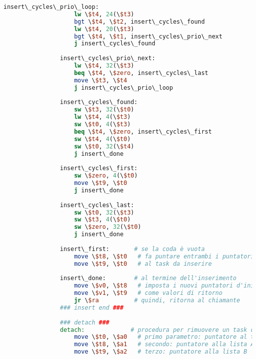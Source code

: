 \begin{center}
\begin{lstlisting}[language=mips, gobble=14, stepnumber=1]
                insert\_cycles\_prio\_loop:
                    lw \$t4, 24(\$t3)
                    bgt \$t4, \$t2, insert\_cycles\_found
                    lw \$t4, 20(\$t3)
                    bgt \$t4, \$t1, insert\_cycles\_prio\_next
                    j insert\_cycles\_found
                    
                insert\_cycles\_prio\_next:
                    lw \$t4, 32(\$t3)
                    beq \$t4, \$zero, insert\_cycles\_last
                    move \$t3, \$t4
                    j insert\_cycles\_prio\_loop
                    
                insert\_cycles\_found:
                    sw \$t3, 32(\$t0)
                    lw \$t4, 4(\$t3)
                    sw \$t0, 4(\$t3)
                    beq \$t4, \$zero, insert\_cycles\_first
                    sw \$t4, 4(\$t0)
                    sw \$t0, 32(\$t4)
                    j insert\_done
                    
                insert\_cycles\_first:
                    sw \$zero, 4(\$t0)
                    move \$t9, \$t0
                    j insert\_done
                    
                insert\_cycles\_last:
                    sw \$t0, 32(\$t3)
                    sw \$t3, 4(\$t0)
                    sw \$zero, 32(\$t0)
                    j insert\_done
                    
                insert\_first:       # se la coda è vuota
                    move \$t8, \$t0   # fa puntare entrambi i puntatori d'inizio (delle due liste)
                    move \$t9, \$t0   # al task da inserire
                    
                insert\_done:        # al termine dell'inserimento
                    move \$v0, \$t8   # imposta i nuovi puntatori d'inizio delle due liste
                    move \$v1, \$t9   # come valori di ritorno
                    jr \$ra          # quindi, ritorna al chiamante
                ### insert end ###
                
                ### detach ###
                detach:             # procedura per rimuovere un task dalle liste
                    move \$t0, \$a0   # primo parametro: puntatore al task da rimuovere
                    move \$t8, \$a1   # secondo: puntatore alla lista A
                    move \$t9, \$a2   # terzo: puntatore alla lista B
                    

\end{lstlisting}
\end{center}
